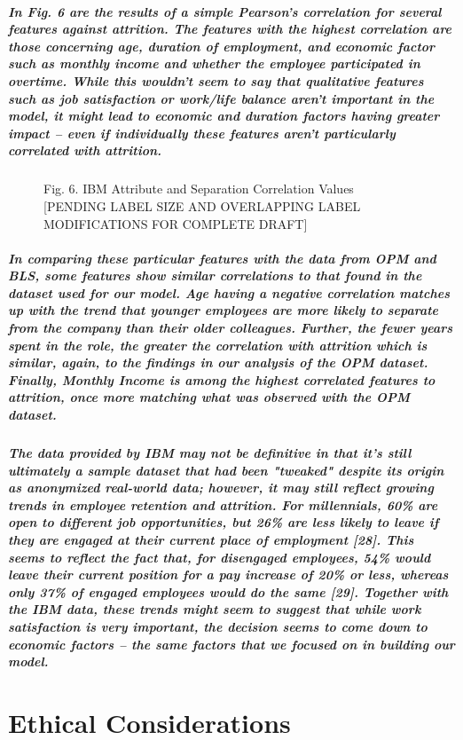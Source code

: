 \documentclass{article}
\begin{document}
\subparagraph{In Fig. 6 are the results of a simple Pearson's correlation for several features against attrition. The features with the highest correlation are those concerning age, duration of employment, and economic factor such as monthly income and whether the employee participated in overtime. While this wouldn't seem to say that qualitative features such as job satisfaction or work/life balance aren't important in the model, it might lead to economic and duration factors having greater impact – even if individually these features aren't particularly correlated with attrition.}

\begin{figure}
\caption{Fig. 6. IBM Attribute and Separation Correlation Values [PENDING LABEL SIZE AND OVERLAPPING LABEL MODIFICATIONS FOR COMPLETE DRAFT]}
\end{figure}
 
\subparagraph{In comparing these particular features with the data from OPM and BLS, some features show similar correlations to that found in the dataset used for our model. Age having a negative correlation matches up with the trend that younger employees are more likely to separate from the company than their older colleagues. Further, the fewer years spent in the role, the greater the correlation with attrition which is similar, again, to the findings in our analysis of the OPM dataset. Finally, Monthly Income is among the highest correlated features to attrition, once more matching what was observed with the OPM dataset.}
 
\subparagraph{The data provided by IBM may not be definitive in that it's still ultimately a sample dataset that had been "tweaked" despite its origin as anonymized real-world data; however, it may still reflect growing trends in employee retention and attrition. For millennials, 60\% are open to different job opportunities, but 26\% are less likely to leave if they are engaged at their current place of employment [28]. This seems to reflect the fact that, for disengaged employees, 54\% would leave their current position for a pay increase of 20\% or less, whereas only 37\% of engaged employees would do the same [29]. Together with the IBM data, these trends might seem to suggest that while work satisfaction is very important, the decision seems to come down to economic factors – the same factors that we focused on in building our model.}
 
\section{Ethical Considerations}
\end{document}

